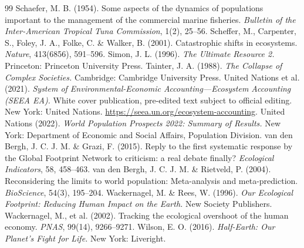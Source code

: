 \documentclass[preprint,12pt,authoryear]{elsarticle}
\begin{document}
\begin{thebibliography}{99}
 Schaefer, M. B. (1954). Some aspects of the dynamics of populations important to the management of the commercial marine fisheries. \emph{Bulletin of the Inter-American Tropical Tuna Commission}, 1(2), 25--56.
 Scheffer, M., Carpenter, S., Foley, J. A., Folke, C. \& Walker, B. (2001). Catastrophic shifts in ecosystems. \emph{Nature}, 413(6856), 591--596.
 Simon, J. L. (1996). \emph{The Ultimate Resource 2.} Princeton: Princeton University Press.
 Tainter, J. A. (1988). \emph{The Collapse of Complex Societies.} Cambridge: Cambridge University Press.
 United Nations et al. (2021). \emph{System of Environmental-Economic Accounting---Ecosystem Accounting (SEEA EA).} White cover publication, pre-edited text subject to official editing. New York: United Nations. \url{https://seea.un.org/ecosystem-accounting}.
 United Nations (2022). \emph{World Population Prospects 2022: Summary of Results.} New York: Department of Economic and Social Affairs, Population Division.
 van den Bergh, J. C. J. M. \& Grazi, F. (2015). Reply to the first systematic response by the Global Footprint Network to criticism: a real debate finally? \emph{Ecological Indicators}, 58, 458--463.
 van den Bergh, J. C. J. M. \& Rietveld, P. (2004). Reconsidering the limits to world population: Meta-analysis and meta-prediction. \emph{BioScience}, 54(3), 195--204.
 Wackernagel, M. \& Rees, W. (1996). \emph{Our Ecological Footprint: Reducing Human Impact on the Earth.} New Society Publishers.
 Wackernagel, M., et al. (2002). Tracking the ecological overshoot of the human economy. \emph{PNAS}, 99(14), 9266--9271.
 Wilson, E. O. (2016). \emph{Half-Earth: Our Planet's Fight for Life.} New York: Liveright.
\end{thebibliography}
\end{document}
